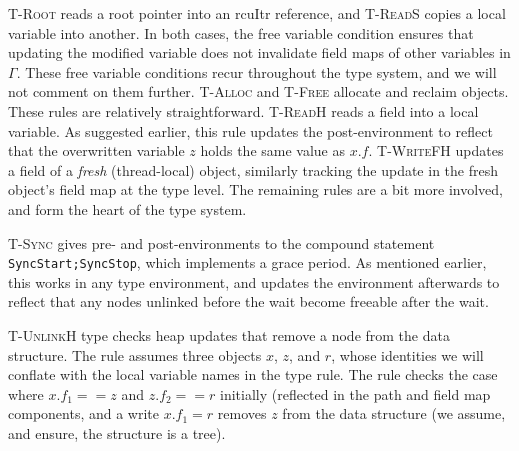\textsc{T-Root} reads a root pointer into an \textsf{rcuItr} reference, and \textsc{T-ReadS} copies a local variable into another.  In both cases, the free variable condition ensures that updating the modified variable does not invalidate field maps of other variables in $\Gamma$. These free variable conditions recur throughout the type system, and we will not comment on them further.
\textsc{T-Alloc} and \textsc{T-Free} allocate and reclaim objects. These rules are relatively straightforward.
\textsc{T-ReadH} reads a field into a local variable.
As suggested earlier, this rule updates the post-environment to reflect that the overwritten variable $z$ holds the same value as $x.f$.
\textsc{T-WriteFH} updates a field of a \emph{fresh} (thread-local) object, similarly tracking the update in the fresh object's field map at the type level.
The remaining rules are a bit more involved, and form the heart of the type system.

\textsc{T-Sync} gives pre- and post-environments to the compound statement \lstinline|SyncStart;SyncStop|, which implements a grace period.  As mentioned earlier, this works in any type environment, and updates the environment afterwards to reflect that any nodes \textsf{unlinked} before the wait become \textsf{freeable} after the wait.

\textsc{T-UnlinkH} type checks heap updates that remove a node from the data structure.  The rule assumes three objects $x$, $z$, and $r$, whose identities we will conflate with the local variable names in the type rule.  The rule checks the case where $x.f_1==z$ and $z.f_2==r$ initially (reflected in the path and field map components, and a write $x.f_1=r$ removes $z$ from the data structure (we assume, and ensure, the structure is a tree).

